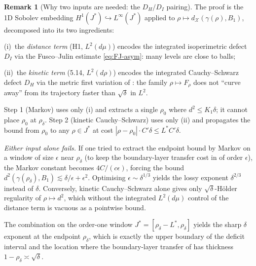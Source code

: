 \documentclass[11pt]{article}
\theoremstyle{definition}
\newtheorem{remark}[theorem]{Remark}
\newcommand{\X}{\mathcal X}
\begin{document}
\begin{remark}[Why two inputs are needed: the $D_H/D_I$ pairing]
\label{rem:why-two-inputs}
The proof is the 1D Sobolev embedding
$H^1(J^*)\hookrightarrow L^\infty(J^*)$ applied to
$\rho\mapsto d_\X(\gamma(\rho),B_1)$, decomposed into its two ingredients:

(i)~the \emph{distance term} (H1, $L^2(d\mu)$) encodes the integrated
isoperimetric defect $D_I$ via the Fusco--Julin estimate
\eqref{eq:FJ-asym}: many levels are close to balls;

(ii)~the \emph{kinetic term} (5.14, $L^2(d\rho)$) encodes the
integrated Cauchy--Schwarz defect $D_H$ via the metric first variation
of \cite{MetricFramework}: the family $\rho\mapsto F_\rho$ does not
``curve away'' from its trajectory faster than $\sqrt\delta$ in
$L^2$.

Step 1 (Markov) uses only (i) and extracts a single $\rho_0$ where
$d^2\le K_1\delta$; it cannot place $\rho_0$ at $\rho_\delta$.
Step 2 (kinetic Cauchy--Schwarz) uses only (ii) and propagates the
bound from $\rho_0$ to any $\rho\in J^*$ at cost
$|\rho-\rho_0|\cdot C'\delta\le L^*C'\delta$.

\emph{Either input alone fails.} If one tried to extract the endpoint
bound by Markov on a window of size $\epsilon$ near $\rho_\delta$
(to keep the boundary-layer transfer cost in
\cite{BoundaryLayerTransfer} of order $\epsilon$), the Markov constant
becomes $4C/(c\epsilon)$, forcing the bound
$d^2(\gamma(\rho_\delta),B_1)\lesssim\delta/\epsilon+\epsilon^2$.
Optimising $\epsilon\sim\delta^{1/3}$ yields the lossy exponent
$\delta^{2/3}$ instead of $\delta$.  Conversely, kinetic Cauchy--Schwarz
alone gives only $\sqrt\delta$-H\"older regularity of $\rho\mapsto d^2$,
which without the integrated $L^2(d\mu)$ control of the distance term
is vacuous as a pointwise bound.

The combination on the order-one window $J^*=[\rho_\delta-L^*,\rho_\delta]$
yields the sharp $\delta$ exponent at the endpoint $\rho_\delta$,
which is exactly the upper boundary of the deficit interval and the
location where the boundary-layer transfer of
\cite{BoundaryLayerTransfer} has thickness $1-\rho_\delta\asymp\sqrt\delta$.
\end{remark}
\end{document}
